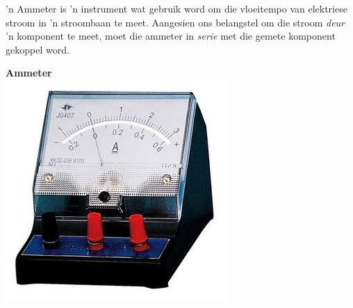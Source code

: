 \begin{minipage}{.5\textwidth}
 'n Ammeter is 'n instrument wat gebruik word om die vloeitempo van elektriese
stroom in 'n stroombaan te meet. Aangesien ons belangstel om die stroom
\textit{deur} 'n komponent te meet, moet die ammeter in \textit{serie} met die
gemete komponent gekoppel word.
\begin{center}
\label{fig:p:em:ec10:ammeter}
\end{center}
\end{minipage}
\begin{minipage}{.5\textwidth}
\begin{center}
\textbf{Ammeter}\\
\includegraphics[width=.6\textwidth]{photos/ammeter.jpg}\\
\end{center}  
\end{minipage}


